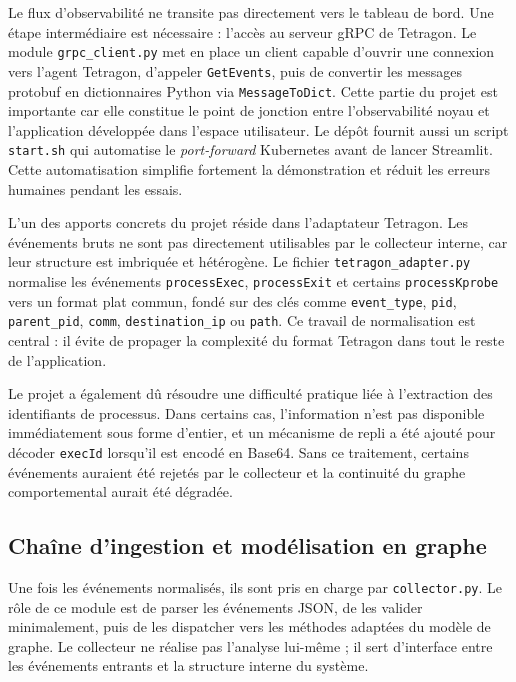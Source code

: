\documentclass[a4paper,12pt]{article}
\begin{document}
Le flux d'observabilité ne transite pas directement vers le tableau de bord. Une étape intermédiaire est nécessaire : l'accès au serveur gRPC de Tetragon. Le module \texttt{grpc\_client.py} met en place un client capable d'ouvrir une connexion vers l'agent Tetragon, d'appeler \texttt{GetEvents}, puis de convertir les messages protobuf en dictionnaires Python via \texttt{MessageToDict}. Cette partie du projet est importante car elle constitue le point de jonction entre l'observabilité noyau et l'application développée dans l'espace utilisateur. Le dépôt fournit aussi un script \texttt{start.sh} qui automatise le \textit{port-forward} Kubernetes avant de lancer Streamlit. Cette automatisation simplifie fortement la démonstration et réduit les erreurs humaines pendant les essais.

L'un des apports concrets du projet réside dans l'adaptateur Tetragon. Les événements bruts ne sont pas directement utilisables par le collecteur interne, car leur structure est imbriquée et hétérogène. Le fichier \texttt{tetragon\_adapter.py} normalise les événements \texttt{processExec}, \texttt{processExit} et certains \texttt{processKprobe} vers un format plat commun, fondé sur des clés comme \texttt{event\_type}, \texttt{pid}, \texttt{parent\_pid}, \texttt{comm}, \texttt{destination\_ip} ou \texttt{path}. Ce travail de normalisation est central : il évite de propager la complexité du format Tetragon dans tout le reste de l'application.

Le projet a également dû résoudre une difficulté pratique liée à l'extraction des identifiants de processus. Dans certains cas, l'information n'est pas disponible immédiatement sous forme d'entier, et un mécanisme de repli a été ajouté pour décoder \texttt{execId} lorsqu'il est encodé en Base64. Sans ce traitement, certains événements auraient été rejetés par le collecteur et la continuité du graphe comportemental aurait été dégradée.

\subsection{Chaîne d'ingestion et modélisation en graphe}

Une fois les événements normalisés, ils sont pris en charge par \texttt{collector.py}. Le rôle de ce module est de parser les événements JSON, de les valider minimalement, puis de les dispatcher vers les méthodes adaptées du modèle de graphe. Le collecteur ne réalise pas l'analyse lui-même ; il sert d'interface entre les événements entrants et la structure interne du système.
\end{document}
